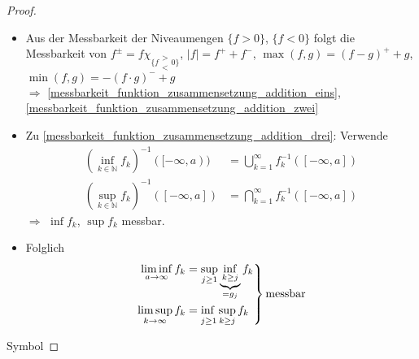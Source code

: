 \begin{proof}
\begin{itemize}
	\item Aus der Messbarkeit der Niveaumengen $\{ f > 0\}$, $\{ f < 0\}$ folgt die Messbarkeit von $f^{\pm} = f\chi_{\{ f \substack{>\\<}0\}}$, $\vert f\vert = f^{+} + f^{-}$, $\max(f,g) = (f - g)^+ + g$, $\min(f,g) = -(f\cdot g)^- + g$ \\
	$\Rightarrow$ \ref{messbarkeit_funktion_zusammensetzung_addition_eins}, \ref{messbarkeit_funktion_zusammensetzung_addition_zwei}
	
	\item Zu \ref{messbarkeit_funktion_zusammensetzung_addition_drei}: Verwende \begin{align*}
		\left(\inf_{k\in\mathbb{N}} f_k\right)^{-1}([-\infty,a)) &= \bigcup_{k=1}^\infty f_k^{-1}([-\infty,a]) \\
		\left(\sup_{k\in\mathbb{N}} f_k\right)^{-1}([-\infty,a]) &= \bigcap_{k=1}^\infty f_k^{-1}([-\infty,a])
	\end{align*}
	$\Rightarrow$ $\inf f_k$, $\sup f_k$ messbar.
	
	\item Folglich \begin{align*}
		\left.\begin{aligned}
			\liminf\limits_{a\to\infty} f_k &= \sup\limits_{j\ge 1} \underbrace{\inf\limits_{k\ge j}}_{=g_j} f_k \\
			\limsup\limits_{k\to\infty} f_k &= \adjustlimits{\inf}_{j\ge 1} {\sup}_{k\ge j} f_k
		\end{aligned}\right\} \begin{gathered}
			\text{messbar}
		\end{gathered}
	\end{align*}
	\end{itemize}
	\hfill\csname\InTheoType Symbol\endcsname
\end{proof}

